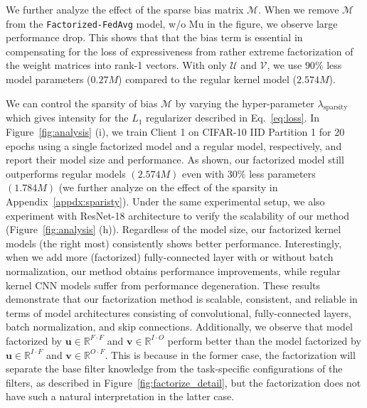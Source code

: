 We further analyze the effect of the sparse bias matrix $\mathcal{M}$. When we remove $\mathcal{M}$ from the \texttt{Factorized-FedAvg} model, w/o Mu in the figure, we observe large performance drop. This shows that that the bias term is essential in compensating for the loss of expressiveness from rather extreme factorization of the weight matrices into rank-1 vectors. With only $\mathcal{U}$ and $\mathcal{V}$, we use $90\%$ less model parameters ($0.27 M$) compared to the regular kernel model ($2.574 M$). 




We can control the sparsity of bias $\mathcal{M}$ by varying the hyper-parameter $\lambda_{\text{sparsity}}$ which gives intensity for the $L_1$ regularizer described in Eq.~\ref{eq:loss}. In Figure~\ref{fig:analysis} (i), we train Client 1 on CIFAR-10 IID Partition 1 for 20 epochs using a single factorized model and a regular model, respectively, and report their model size and performance. As shown, our factorized model still outperforms regular models $(2.574 M)$ even with $30\%$ less parameters $(1.784 M)$ (we further analyze on the effect of the sparsity in Appendix~\ref{appdx:sparisty}). Under the same experimental setup, we also experiment with ResNet-18 architecture to verify the scalability of our method (Figure~\ref{fig:analysis} (h)). Regardless of the model size, our factorized kernel models (the right most) consistently shows better performance. Interestingly, when we add more (factorized) fully-connected layer with or without batch normalization, our method obtains performance improvements, while regular kernel CNN models suffer from performance degeneration. These results demonstrate that our factorization method is scalable, consistent, and reliable in terms of model architectures consisting of convolutional, fully-connected layers, batch normalization, and skip connections. Additionally, we observe that model factorized by $\textbf{u} \in \mathbb{R}^{F \cdot F}$ and $\textbf{v} \in \mathbb{R}^{I \cdot O} $ perform better than the model factorized by $\textbf{u} \in \mathbb{R}^{I \cdot F}$ and $\textbf{v} \in \mathbb{R}^{O \cdot F} $. This is because in the former case, the factorization will separate the base filter knowledge from  the task-specific configurations of the filters, as described in Figure~\ref{fig:factorize_detail}, but the factorization does not have such a natural interpretation in the latter case.  


\vspace{-0.1in}

